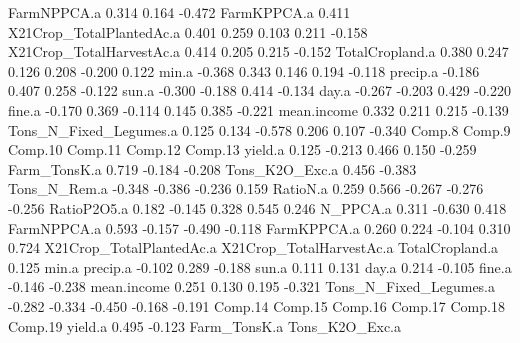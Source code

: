 \documentclass{report}
\begin{document}
\begin{Schunk}
\begin{Soutput}
FarmNPPCA.a                      0.314  0.164                      -0.472
FarmKPPCA.a                      0.411                                   
X21Crop_TotalPlantedAc.a  0.401         0.259  0.103  0.211 -0.158       
X21Crop_TotalHarvestAc.a  0.414         0.205         0.215 -0.152       
TotalCropland.a           0.380         0.247  0.126  0.208 -0.200  0.122
min.a                    -0.368         0.343  0.146  0.194 -0.118       
precip.a                 -0.186  0.407                0.258 -0.122       
sun.a                    -0.300 -0.188  0.414                      -0.134
day.a                    -0.267 -0.203  0.429                      -0.220
fine.a                   -0.170  0.369 -0.114  0.145  0.385 -0.221       
mean.income               0.332         0.211                0.215 -0.139
Tons_N_Fixed_Legumes.a           0.125  0.134 -0.578  0.206  0.107 -0.340
                         Comp.8 Comp.9 Comp.10 Comp.11 Comp.12 Comp.13
yield.a                          0.125 -0.213   0.466   0.150  -0.259 
Farm_TonsK.a              0.719        -0.184                  -0.208 
Tons_K2O_Exc.a            0.456 -0.383                                
Tons_N_Rem.a                    -0.348 -0.386  -0.236           0.159 
RatioN.a                  0.259  0.566 -0.267  -0.276  -0.256         
RatioP2O5.a               0.182 -0.145  0.328           0.545   0.246 
N_PPCA.a                         0.311         -0.630   0.418         
FarmNPPCA.a                             0.593  -0.157  -0.490  -0.118 
FarmKPPCA.a               0.260  0.224 -0.104   0.310           0.724 
X21Crop_TotalPlantedAc.a                                              
X21Crop_TotalHarvestAc.a                                              
TotalCropland.a                                                 0.125 
min.a                                                                 
precip.a                        -0.102                  0.289  -0.188 
sun.a                                           0.111           0.131 
day.a                                           0.214          -0.105 
fine.a                          -0.146                         -0.238 
mean.income                      0.251          0.130   0.195  -0.321 
Tons_N_Fixed_Legumes.a   -0.282 -0.334 -0.450  -0.168  -0.191         
                         Comp.14 Comp.15 Comp.16 Comp.17 Comp.18 Comp.19
yield.a                   0.495  -0.123                                 
Farm_TonsK.a                                                            
Tons_K2O_Exc.a                                                          

\end{Soutput}
\end{Schunk}
\end{document}
